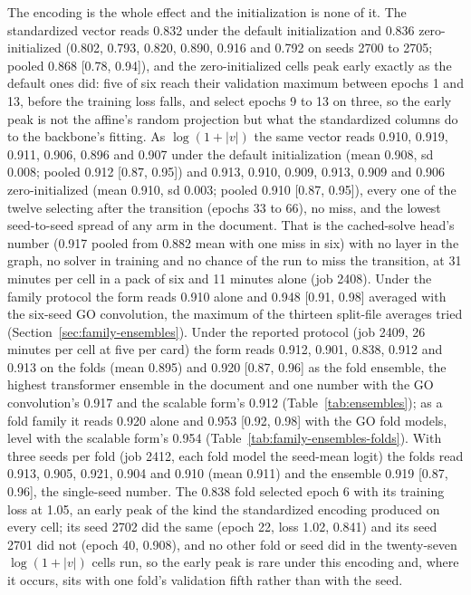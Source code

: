 The encoding is the whole effect and the initialization is none of it. The
standardized vector reads 0.832 under the default initialization and 0.836
zero-initialized (0.802, 0.793, 0.820, 0.890, 0.916 and 0.792 on seeds 2700 to 2705;
pooled 0.868 [0.78, 0.94]), and the zero-initialized cells peak early exactly as the
default ones did: five of six reach their validation maximum between epochs 1 and 13,
before the training loss falls, and select epochs 9 to 13 on three, so the early
peak is not the affine's random projection but what the standardized columns do to
the backbone's fitting. As $\log(1 + |v|)$ the same vector reads 0.910, 0.919, 0.911,
0.906, 0.896 and 0.907 under the default initialization (mean 0.908, sd 0.008; pooled
0.912 [0.87, 0.95]) and 0.913, 0.910, 0.909, 0.913, 0.909 and 0.906 zero-initialized
(mean 0.910, sd 0.003; pooled 0.910 [0.87, 0.95]), every one of the twelve selecting
after the transition (epochs 33 to 66), no miss, and the lowest seed-to-seed spread of
any arm in the document. That is the cached-solve head's number (0.917 pooled from
0.882 mean with one miss in six) with no layer in the graph, no solver in training and
no chance of the run to miss the transition, at 31 minutes per cell in a pack of six
and 11 minutes alone (job 2408). Under the family protocol the form reads 0.910 alone
and 0.948 [0.91, 0.98] averaged with the six-seed GO convolution, the maximum of the
thirteen split-file averages tried (Section~\ref{sec:family-ensembles}). Under the
reported protocol (job 2409, 26 minutes per cell at five per card) the form reads
0.912, 0.901, 0.838, 0.912 and 0.913 on the folds (mean 0.895) and 0.920 [0.87, 0.96]
as the fold ensemble, the highest transformer ensemble in the document and one number
with the GO convolution's 0.917 and the scalable form's 0.912
(Table~\ref{tab:ensembles}); as a fold family it reads 0.920 alone and 0.953
[0.92, 0.98] with the GO fold models, level with the scalable form's 0.954
(Table~\ref{tab:family-ensembles-folds}). With three seeds per fold (job 2412, each
fold model the seed-mean logit) the folds read 0.913, 0.905, 0.921, 0.904 and 0.910
(mean 0.911) and the ensemble 0.919 [0.87, 0.96], the single-seed number. The 0.838
fold selected epoch 6 with its training loss at 1.05, an early peak of the kind the
standardized encoding produced on every cell; its seed 2702 did the same (epoch 22,
loss 1.02, 0.841) and its seed 2701 did not (epoch 40, 0.908), and no other fold or
seed did in the twenty-seven $\log(1 + |v|)$ cells run, so the early peak is rare
under this encoding and, where it occurs, sits with one fold's validation fifth
rather than with the seed.

